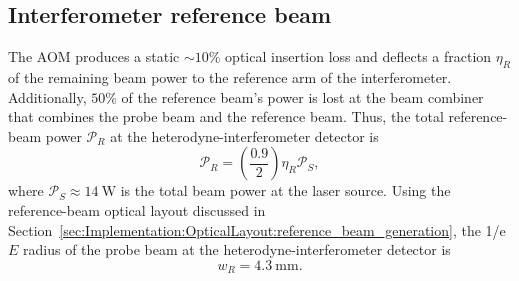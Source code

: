 \subsection{Interferometer reference beam}
\label{sec:Implementation:PowerDistribution:interferometer_reference_beam}
The AOM produces a static $\sim 10\%$ optical insertion loss and
deflects a fraction $\eta_R$ of the remaining beam power
to the reference arm of the interferometer.
Additionally, $50\%$ of the reference beam's power is lost
at the beam combiner that combines the probe beam and the reference beam.
Thus, the total reference-beam power $\mathcal{P}_R$
at the heterodyne-interferometer detector is
\begin{equation}
  \mathcal{P}_R
  =
  \left( \frac{0.9}{2} \right) \eta_R \mathcal{P}_S,
  \label{eq:Implementation:reference_beam_power_constraint}
\end{equation}
where $\mathcal{P}_S \approx \SI{14}{\watt}$
is the total beam power at the laser source.
Using the reference-beam optical layout discussed in
Section~\ref{sec:Implementation:OpticalLayout:reference_beam_generation},
the 1/e $E$ radius of the probe beam
at the heterodyne-interferometer detector is
\begin{equation}
  w_R = \SI{4.3}{\milli\meter}.
  \label{eq:Implementation:reference_beam_radius_at_detector}
\end{equation}


